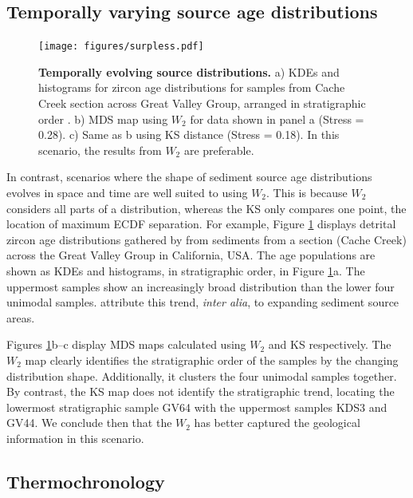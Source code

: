 \documentclass[gchron, manuscript]{article}
\begin{document}
\subsection{Temporally varying source age distributions}

\begin{figure}
    \centering
    \texttt{[image: figures/surpless.pdf]}
    \caption{\textbf{Temporally evolving source distributions.} a) KDEs and histograms for zircon age distributions for samples from Cache Creek section across Great Valley Group, arranged in stratigraphic order \citep{degraaff-surpless_detrital_2002}. b) MDS map using $W_2$ for data shown in panel a (Stress = 0.28). c) Same as b using KS distance (Stress = 0.18). In this scenario, the results from $W_2$ are preferable. } 
    \label{fig:surpless}
\end{figure}

In contrast, scenarios where the shape of sediment source age distributions evolves in space and time are well suited to using $W_2$. This is because $W_2$ considers all parts of a distribution, whereas the KS only compares one point, the location of maximum ECDF separation. For example, Figure \ref{fig:surpless} displays detrital zircon age distributions gathered by \citet{degraaff-surpless_detrital_2002} from sediments from a section (Cache Creek) across the Great Valley Group in California, USA. The age populations are shown as KDEs and histograms, in stratigraphic order, in Figure \ref{fig:surpless}a. The uppermost samples show an increasingly broad distribution than the lower four unimodal samples. \citet{degraaff-surpless_detrital_2002} attribute this trend, \textit{inter alia}, to expanding sediment source areas. 

Figures \ref{fig:surpless}b--c display MDS maps calculated using $W_2$ and KS respectively. The $W_2$ map clearly identifies the stratigraphic order of the samples by the changing distribution shape. Additionally, it clusters the four unimodal samples together. By contrast, the KS map does not identify the stratigraphic trend, locating the lowermost stratigraphic sample GV64 with the uppermost samples KDS3 and GV44. We conclude then that the $W_2$ has better captured the geological information in this scenario.

\subsection{Thermochronology}
\end{document}
